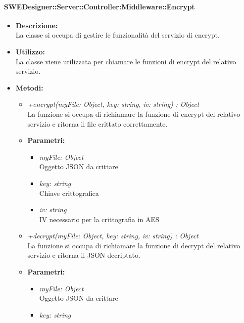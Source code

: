       \paragraph{SWEDesigner::Server::Controller:Middleware::Encrypt}
        \begin{itemize}
          \item \textbf{Descrizione: }\\
          La classe si occupa di gestire le funzionalità del servizio di encrypt.
          \item \textbf{Utilizzo: }\\
          La classe viene utilizzata per chiamare le funzioni di encrypt del relativo servizio.
          \item \textbf{Metodi:}\\
          \begin{itemize}
            \item \emph{+encrypt(myFile: Object, key: string, iv: string) : Object}\\
            La funzione si occupa di richiamare la funzione di encrypt del relativo servizio e ritorna il file crittato correttamente.
            \item \textbf{Parametri: }\\
            \begin{itemize}
              \item \emph{myFile: Object}\\
              Oggetto JSON da crittare
              \item \emph{key: string}\\
              Chiave crittografica
              \item \emph{iv: string}\\
              IV necessario per la crittografia in AES
            \end{itemize}
            \item \emph{+decrypt(myFile: Object, key: string, iv: string) : Object}\\
            La funzione si occupa di richiamare la funzione di decrypt del relativo servizio e ritorna il JSON decriptato.
            \item \textbf{Parametri: }\\
            \begin{itemize}
              \item \emph{myFile: Object}\\
              Oggetto JSON da crittare
              \item \emph{key: string}\\

\end{itemize}
\end{itemize}
\end{itemize}
